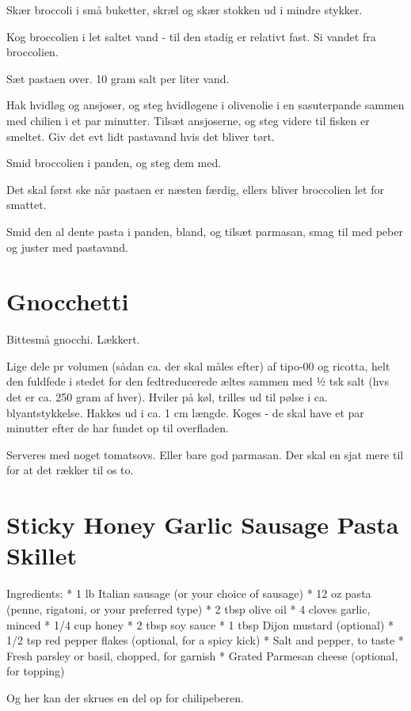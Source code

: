 \documentclass[
]{book}
\begin{document}
Skær broccoli i små buketter, skræl og skær stokken ud i mindre stykker.

Kog broccolien i let saltet vand - til den stadig er relativt fast. Si vandet fra broccolien.

Sæt pastaen over. 10 gram salt per liter vand.

Hak hvidløg og ansjoser, og steg hvidløgene i olivenolie i en sasuterpande sammen med chilien i et par minutter. Tilsæt ansjoserne, og steg videre til fisken er smeltet. Giv det evt lidt pastavand hvis det bliver tørt.

Smid broccolien i panden, og steg dem med.

Det skal først ske når pastaen er næsten færdig, ellers bliver broccolien let for smattet.

Smid den al dente pasta i panden, bland, og tilsæt parmasan, smag til med peber og juster med pastavand.

\section{Gnocchetti}\label{gnocchetti}

Bittesmå gnocchi. Lækkert.

Lige dele pr volumen (sådan ca. der skal måles efter) af tipo-00 og ricotta,
helt den fuldfede i stedet for den fedtreducerede æltes sammen med ½ tsk salt
(hvs det er ca. 250 gram af hver).
Hviler på køl, trilles ud til pølse i ca. blyantstykkelse.
Hakkes ud i ca. 1 cm længde.
Koges - de skal have et par minutter efter de har fundet op til overfladen.

Serveres med noget tomatsovs. Eller bare god parmasan. Der skal en sjat mere
til for at det rækker til os to.

\section{Sticky Honey Garlic Sausage Pasta Skillet}\label{sticky-honey-garlic-sausage-pasta-skillet}

Ingredients:
* 1 lb Italian sausage (or your choice of sausage)
* 12 oz pasta (penne, rigatoni, or your preferred type)
* 2 tbsp olive oil
* 4 cloves garlic, minced
* 1/4 cup honey
* 2 tbsp soy sauce
* 1 tbsp Dijon mustard (optional)
* 1/2 tsp red pepper flakes (optional, for a spicy kick)
* Salt and pepper, to taste
* Fresh parsley or basil, chopped, for garnish
* Grated Parmesan cheese (optional, for topping)

Og her kan der skrues en del op for chilipeberen.
\end{document}
